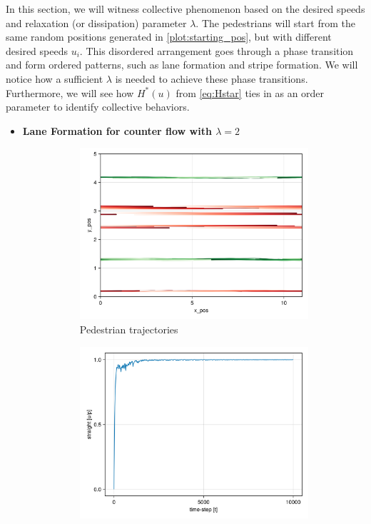 In this section, we will witness collective phenomenon based on the desired speeds and relaxation (or dissipation) parameter $\lambda$. The pedestrians will start from the same random positions generated in \autoref{plot:starting_pos}, but with different desired speeds $u_i$. This disordered arrangement goes through a phase transition and form ordered patterns, such as lane formation and stripe formation. We will notice how a sufficient $\lambda$ is needed to achieve these phase transitions. Furthermore, we will see how $H^*(u)$ from \autoref{eq:Hstar} ties in as an order parameter to identify collective behaviors.
\begin{itemize}
    \item \textbf{Lane Formation for counter flow with $\lambda = 2$}
    \begin{figure}[H]
        \centering
        \begin{subfigure}{.49\textwidth}
            \centering
            \includegraphics[width=\linewidth]{figures/ch5_collective/counter.png}
            \caption{Pedestrian trajectories}
            \label{plot:counter_traj}
        \end{subfigure}
        \begin{subfigure}{.49\textwidth}
            \centering
            \includegraphics[width=\linewidth]{figures/ch5_collective/straight_counter.png}

\end{subfigure}
\end{figure}
\end{itemize}
